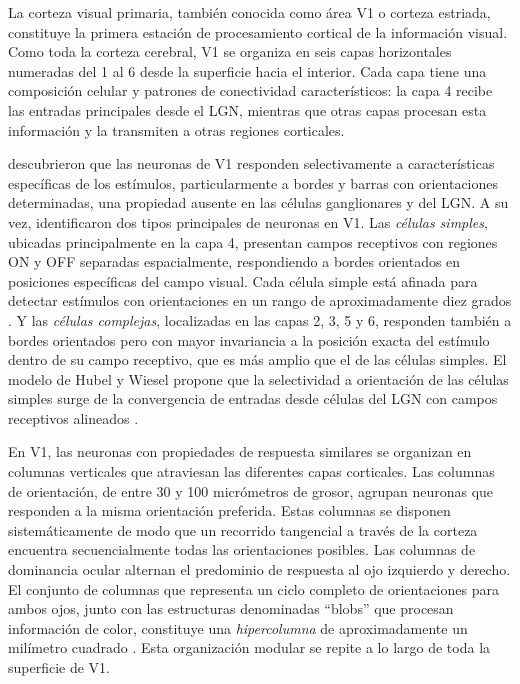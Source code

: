 La corteza visual primaria, también conocida como área V1 o corteza estriada, constituye la primera estación de procesamiento cortical de la información visual. Como toda la corteza cerebral, V1 se organiza en seis capas horizontales numeradas del 1 al 6 desde la superficie hacia el interior. Cada capa tiene una composición celular y patrones de conectividad característicos: la capa 4 recibe las entradas principales desde el LGN, mientras que otras capas procesan esta información y la transmiten a otras regiones corticales.

\citet{hubel1959receptive} descubrieron que las neuronas de V1 responden selectivamente a características específicas de los estímulos, particularmente a bordes y barras con orientaciones determinadas, una propiedad ausente en las células ganglionares y del \acrshort{LGN}. A su vez, identificaron dos tipos principales de neuronas en V1. Las \textit{células simples}, ubicadas principalmente en la capa 4, presentan campos receptivos con regiones ON y OFF separadas espacialmente, respondiendo a bordes orientados en posiciones específicas del campo visual. Cada célula simple está afinada para detectar estímulos con orientaciones en un rango de aproximadamente diez grados \citep{blanco2014historia}. Y las \textit{células complejas}, localizadas en las capas 2, 3, 5 y 6, responden también a bordes orientados pero con mayor invariancia a la posición exacta del estímulo dentro de su campo receptivo, que es más amplio que el de las células simples. El modelo de Hubel y Wiesel propone que la selectividad a orientación de las células simples surge de la convergencia de entradas desde células del LGN con campos receptivos alineados \citep{dayan2005theoretical}.

En V1, las neuronas con propiedades de respuesta similares se organizan en columnas verticales que atraviesan las diferentes capas corticales. Las columnas de orientación, de entre 30 y 100 micrómetros de grosor, agrupan neuronas que responden a la misma orientación preferida. Estas columnas se disponen sistemáticamente de modo que un recorrido tangencial a través de la corteza encuentra secuencialmente todas las orientaciones posibles. Las columnas de dominancia ocular alternan el predominio de respuesta al ojo izquierdo y derecho. El conjunto de columnas que representa un ciclo completo de orientaciones para ambos ojos, junto con las estructuras denominadas ``blobs'' que procesan información de color, constituye una \textit{hipercolumna} de aproximadamente un milímetro cuadrado \citep{blanco2014historia, dayan2005theoretical}. Esta organización modular se repite a lo largo de toda la superficie de V1.

